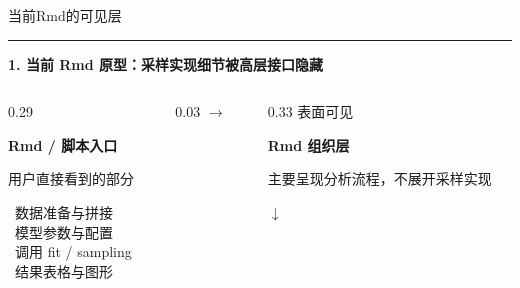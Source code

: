 \documentclass[UTF8,aspectratio=169,fontset=fandol]{ctexbeamer}
\newcommand{\midpaneltopgap}{\vspace{0.35em}}
\newcommand{\midpanelminitopgap}{\vspace{0.55em}}
\begin{document}
\begin{frame}[t,shrink=10]
\vspace{0.2em}
{\color{textgray}\Large 当前Rmd的可见层}\par
\vspace{0.35em}
{\color{linegray}\rule{\textwidth}{0.5pt}}\par
\vspace{0.30em}

{\Large\bfseries 1. 当前 Rmd 原型：采样实现细节被高层接口隐藏}\par
\vspace{0.7em}

\begin{columns}[T,onlytextwidth]
\begin{column}{0.29\textwidth}
\begin{leftpanel}
{\fontsize{14}{16}\selectfont\bfseries\color{blue1} Rmd / 脚本入口}\par
{\small\color{textgray} 用户直接看到的部分}\par
\vspace{0.25em}

\footnotesize
\textbullet\ 数据准备与拼接\\
\textbullet\ 模型参数与配置\\
\textbullet\ 调用 fit / sampling\\
\textbullet\ 结果表格与图形
\end{leftpanel}
\end{column}

\begin{column}{0.03\textwidth}
\vspace*{0.17\textheight}
{\fontsize{10}{10}\selectfont\color{arrowgray}$\rightarrow$}
\end{column}

\begin{column}{0.33\textwidth}
\centering
{\small\color{textgray} 表面可见}\par
\vspace{0.1em}

\begin{midpanel}
{\fontsize{13}{15}\selectfont\bfseries Rmd 组织层}\par
\vspace{0.35em}

{\small 主要呈现分析流程，不展开采样实现}\par
\midpaneltopgap
{\large\color{arrowgray}$\downarrow$}\par
\midpanelminitopgap


\end{midpanel}
\end{column}
\end{columns}
\end{frame}
\end{document}
